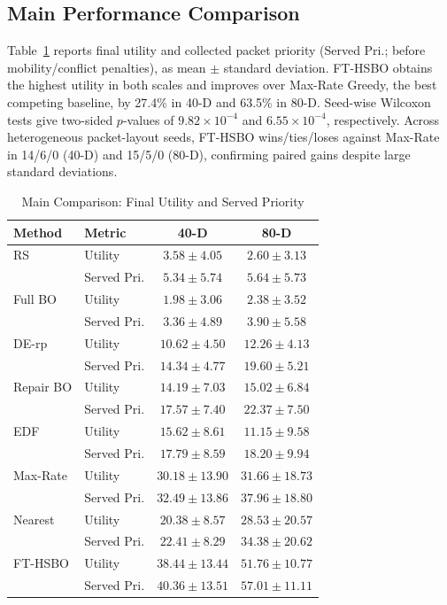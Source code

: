 \documentclass[letterpaper,journal]{IEEEtran}
\begin{document}
\subsection{Main Performance Comparison}
Table~\ref{tab:main} reports final utility and collected packet priority (Served Pri.; before mobility/conflict penalties), as mean $\pm$ standard deviation. FT-HSBO obtains the highest utility in both scales and improves over Max-Rate Greedy, the best competing baseline, by 27.4\% in 40-D and 63.5\% in 80-D. Seed-wise Wilcoxon tests give two-sided $p$-values of $9.82\times10^{-4}$ and $6.55\times10^{-4}$, respectively. Across heterogeneous packet-layout seeds, FT-HSBO wins/ties/loses against Max-Rate in 14/6/0 (40-D) and 15/5/0 (80-D), confirming paired gains despite large standard deviations.

\begin{table}[!ht]
\caption{Main Comparison: Final Utility and Served Priority}
\label{tab:main}
\centering
\scriptsize
\begingroup
\setlength{\tabcolsep}{2.4pt}
\renewcommand{\arraystretch}{1.10}
\begin{tabular*}{\columnwidth}{@{\extracolsep{\fill}}llcc@{}}
\toprule
Method & Metric & 40-D & 80-D \\
\midrule
RS & Utility & $3.58\pm4.05$ & $2.60\pm3.13$ \\
 & Served Pri. & $5.34\pm5.74$ & $5.64\pm5.73$ \\
\addlinespace[1pt]
Full BO & Utility & $1.98\pm3.06$ & $2.38\pm3.52$ \\
 & Served Pri. & $3.36\pm4.89$ & $3.90\pm5.58$ \\
\addlinespace[1pt]
DE-rp & Utility & $10.62\pm4.50$ & $12.26\pm4.13$ \\
 & Served Pri. & $14.34\pm4.77$ & $19.60\pm5.21$ \\
\addlinespace[1pt]
Repair BO & Utility & $14.19\pm7.03$ & $15.02\pm6.84$ \\
 & Served Pri. & $17.57\pm7.40$ & $22.37\pm7.50$ \\
\addlinespace[1pt]
EDF & Utility & $15.62\pm8.61$ & $11.15\pm9.58$ \\
 & Served Pri. & $17.79\pm8.59$ & $18.20\pm9.94$ \\
\addlinespace[1pt]
Max-Rate & Utility & $30.18\pm13.90$ & $31.66\pm18.73$ \\
 & Served Pri. & $32.49\pm13.86$ & $37.96\pm18.80$ \\
\addlinespace[1pt]
Nearest & Utility & $20.38\pm8.57$ & $28.53\pm20.57$ \\
 & Served Pri. & $22.41\pm8.29$ & $34.38\pm20.62$ \\
\addlinespace[1pt]
FT-HSBO & Utility & $\mathbf{38.44\pm13.44}$ & $\mathbf{51.76\pm10.77}$ \\
 & Served Pri. & $\mathbf{40.36\pm13.51}$ & $\mathbf{57.01\pm11.11}$ \\
\bottomrule
\end{tabular*}
\endgroup
\end{table}
\end{document}

